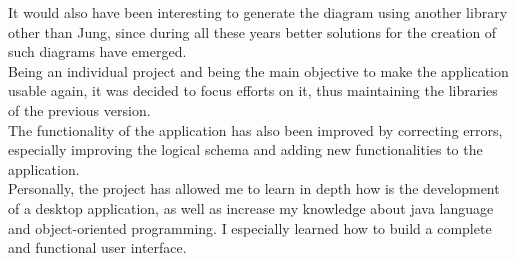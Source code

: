 It would also have been interesting to generate the diagram using another library other than Jung, since during all these years better solutions for the creation of such diagrams have emerged.\\

Being an individual project and being the main objective to make the application usable again, it was decided to focus efforts on it, thus maintaining the libraries of the previous version.\\

The functionality of the application has also been improved by correcting errors, especially improving the logical schema and adding new functionalities to the application.\\

Personally, the project has allowed me to learn in depth how is the development of a desktop application, as well as increase my knowledge about java language and object-oriented programming. I especially learned how to build a complete and functional user interface.\\

